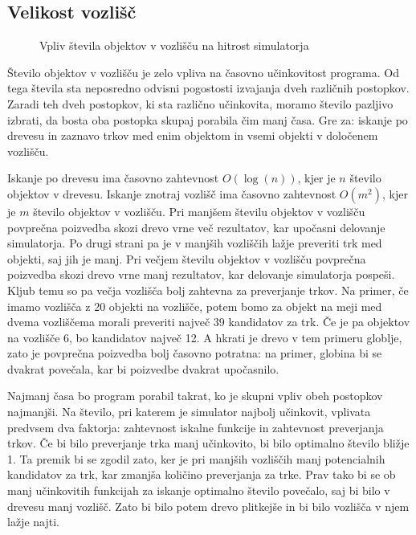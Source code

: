 \documentclass[a4paper,12pt]{article}
\begin{document}
\subsection{Velikost vozlišč}

\begin{figure}
    \caption{Vpliv števila objektov v vozlišču na hitrost simulatorja}%
    \label{boxsizes_data}
\end{figure}

Število objektov v vozlišču je zelo vpliva na časovno učinkovitost programa. Od tega števila sta neposredno
odvisni pogostosti izvajanja dveh različnih postopkov. Zaradi teh dveh postopkov, ki sta različno učinkovita,
moramo število pazljivo izbrati, da bosta oba postopka skupaj porabila čim manj časa.
Gre za: iskanje po drevesu in zaznavo trkov med enim objektom in vsemi objekti v določenem vozlišču.

Iskanje po drevesu ima časovno zahtevnost $O(\log(n))$, kjer je $n$ število objektov v drevesu. Iskanje znotraj vozlišč
ima časovno zahtevnost $O(m^2)$, kjer je $m$ število objektov v vozlišču. Pri manjšem številu objektov v vozlišču
povprečna poizvedba skozi drevo vrne več rezultatov, kar upočasni delovanje simulatorja. Po drugi strani pa je v manjših
vozliščih lažje preveriti trk med objekti, saj jih je manj. Pri večjem številu objektov v vozlišču povprečna poizvedba 
skozi drevo vrne manj rezultatov, kar delovanje simulatorja pospeši. Kljub temu so pa večja vozlišča bolj zahtevna
za preverjanje trkov. Na primer, če imamo vozlišča z 20 objekti na vozlišče, potem bomo za objekt na meji med dvema
vozliščema morali preveriti največ 39 kandidatov za trk. Če je pa objektov na vozlišče 6, bo kandidatov največ 12.
A hkrati je drevo v tem primeru globlje, zato je povprečna poizvedba bolj časovno potratna: na primer, globina bi se dvakrat
povečala, kar bi poizvedbe dvakrat upočasnilo.

Najmanj časa bo program porabil takrat, ko je skupni vpliv obeh postopkov najmanjši. Na število, pri katerem
je simulator najbolj učinkovit, vplivata predvsem dva faktorja: zahtevnost iskalne funkcije in zahtevnost
preverjanja trkov. Če bi bilo preverjanje trka manj učinkovito, bi bilo optimalno število
bližje 1. Ta premik bi se zgodil zato, ker je pri manjših vozliščih manj potencialnih kandidatov za trk, kar
zmanjša količino preverjanja za trke. Prav tako bi se ob manj učinkovitih funkcijah za iskanje optimalno število povečalo, saj
bi bilo v drevesu manj vozlišč. Zato bi bilo potem drevo plitkejše in bi bilo vozlišča v njem lažje najti.
\end{document}
